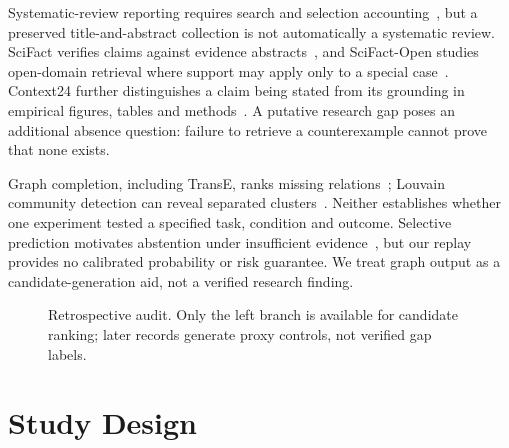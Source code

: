 \documentclass[conference,a4paper]{IEEEtran}
\begin{document}
Systematic-review reporting requires search and selection accounting~\cite{page2021}, but a preserved title-and-abstract collection is not automatically a systematic review. SciFact verifies claims against evidence abstracts~\cite{wadden2020}, and SciFact-Open studies open-domain retrieval where support may apply only to a special case~\cite{wadden2022}. Context24 further distinguishes a claim being stated from its grounding in empirical figures, tables and methods~\cite{chan2024}. A putative research gap poses an additional absence question: failure to retrieve a counterexample cannot prove that none exists.

Graph completion, including TransE, ranks missing relations~\cite{bordes2013}; Louvain community detection can reveal separated clusters~\cite{blondel2008}. Neither establishes whether one experiment tested a specified task, condition and outcome. Selective prediction motivates abstention under insufficient evidence~\cite{geifman2017}, but our replay provides no calibrated probability or risk guarantee. We treat graph output as a candidate-generation aid, not a verified research finding.

\begin{figure}[t]
\centering\footnotesize
{}
\caption{Retrospective audit. Only the left branch is available for candidate ranking; later records generate proxy controls, not verified gap labels.}
\label{fig:protocol}
\end{figure}

\section{Study Design}
\end{document}
